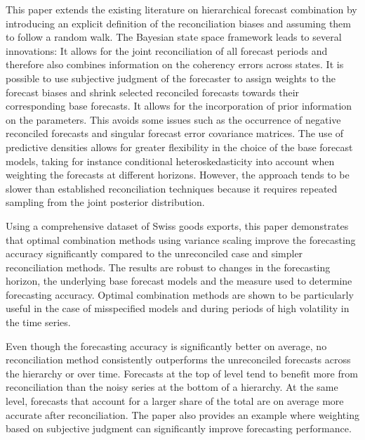 \documentclass[a4paper,fleqn,11pt]{article}
\begin{document}
This paper extends the existing literature on hierarchical forecast combination by introducing an explicit definition of the reconciliation biases and assuming them to follow a random walk. The Bayesian state space framework leads to several innovations: It allows for the joint reconciliation of all forecast periods and therefore also combines information on the coherency errors across states. It is possible to use subjective judgment of the forecaster to assign weights to the forecast biases and shrink selected reconciled forecasts towards their corresponding base forecasts. It allows for the incorporation of prior information on the parameters. This avoids some issues such as the occurrence of negative reconciled forecasts and singular forecast error covariance matrices. The use of predictive densities allows for greater flexibility in the choice of the base forecast models, taking for instance conditional heteroskedasticity into account when weighting the forecasts at different horizons. However, the approach tends to be slower than established reconciliation techniques because it requires repeated sampling from the joint posterior distribution.

Using a comprehensive dataset of Swiss goods exports, this paper demonstrates that optimal combination methods using variance scaling improve the forecasting accuracy significantly compared to the unreconciled case and simpler reconciliation methods. The results are robust to changes in the forecasting horizon, the underlying base forecast models and the measure used to determine forecasting accuracy. Optimal combination methods are shown to be particularly useful in the case of misspecified models and during periods of high volatility in the time series.

Even though the forecasting accuracy is significantly better on average, no reconciliation method consistently outperforms the unreconciled forecasts across the hierarchy or over time. Forecasts at the top of level tend to benefit more from reconciliation than the noisy series at the bottom of a hierarchy. At the same level, forecasts that account for a larger share of the total are on average more accurate after reconciliation. The paper also provides an example where weighting based on subjective judgment can significantly improve forecasting performance.


\clearpage


\clearpage


\end{document}
